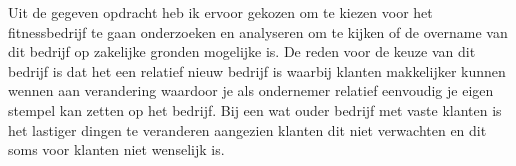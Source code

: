 Uit de gegeven opdracht heb ik ervoor gekozen om te kiezen voor het fitnessbedrijf te gaan onderzoeken en analyseren om te kijken of de overname van dit bedrijf op zakelijke gronden mogelijke is. De reden voor de keuze van dit bedrijf is dat het een relatief nieuw bedrijf is waarbij klanten makkelijker kunnen wennen aan verandering waardoor je als ondernemer relatief eenvoudig je eigen stempel kan zetten op het bedrijf. Bij een wat ouder bedrijf met vaste klanten is het lastiger dingen te veranderen aangezien klanten dit niet verwachten en dit soms voor klanten niet wenselijk is.
